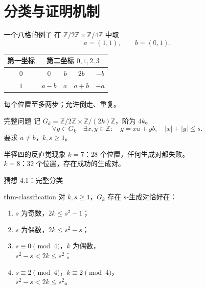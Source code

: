 \documentclass{beamer}
\begin{document}
\section{分类与证明机制}
\begin{frame}{一个八格的例子}
在 $\mathbb Z/2\mathbb Z\times\mathbb Z/4\mathbb Z$ 中取
\[a=(1,1),\qquad b=(0,1).\]
\begin{center}
\begin{tabular}{c|cccc}
第一坐标 & \multicolumn{4}{c}{第二坐标 $0,1,2,3$}\\\hline
$0$ & $0$ & $b$ & $2b$ & $-b$\\
$1$ & $a-b$ & $a$ & $a+b$ & $-a$
\end{tabular}
\end{center}
每个位置至多两步；允许倒走、重复。
\end{frame}
\begin{frame}{完整问题}
记 $G_k=\mathbb Z/2\mathbb Z\times\mathbb Z/(2k)\mathbb Z$，阶为 $4k$。
\[\forall g\in G_k\quad \exists x,y\in\mathbb Z:\quad
 g=xa+yb,\quad |x|+|y|\le s.\]
要求 $a\ne b$，$k,s\ge1$。
\begin{block}{半径四的反直觉现象}
$k=7$：$28$ 个位置，任何生成对都失败。\\
$k=8$：$32$ 个位置，存在成功的生成对。
\end{block}
\end{frame}
\begin{frame}{猜想 4.1：完整分类}
\begin{bookresult}{thm-classification}
对 $k,s\ge1$，$G_k$ 存在 $s$-生成对恰好在：
\begin{enumerate}
\item $s$ 为奇数，$2k\le s^2-1$；
\item $s$ 为偶数，$2k\le s^2-s$；
\item $s\equiv0\pmod4$，$k$ 为偶数，\\
$s^2-s<2k\le s^2$；
\item $s\equiv2\pmod4$，$k\equiv2\pmod4$，\\
$s^2-s<2k\le s^2$。
\end{enumerate}
\end{bookresult}
\end{frame}
\end{document}
